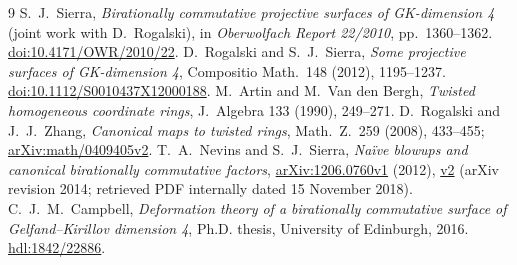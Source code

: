 \documentclass[11pt]{article}
\begin{document}
\begin{thebibliography}{9}
S.~J.~Sierra, \emph{Birationally commutative projective surfaces of
GK-dimension 4} (joint work with D.~Rogalski), in
\emph{Oberwolfach Report 22/2010},
pp.~1360--1362.
\href{https://doi.org/10.4171/OWR/2010/22}{doi:10.4171/OWR/2010/22}.
D.~Rogalski and S.~J.~Sierra,
\emph{Some projective surfaces of GK-dimension 4},
Compositio Math.~148 (2012), 1195--1237.
\href{https://doi.org/10.1112/S0010437X12000188}{doi:10.1112/S0010437X12000188}.
M.~Artin and M.~Van den Bergh,
\emph{Twisted homogeneous coordinate rings},
J.~Algebra 133 (1990), 249--271.
D.~Rogalski and J.~J.~Zhang,
\emph{Canonical maps to twisted rings},
Math.~Z.~259 (2008), 433--455;
\href{https://arxiv.org/abs/math/0409405v2}{arXiv:math/0409405v2}.
T.~A.~Nevins and S.~J.~Sierra,
\emph{Na\"ive blowups and canonical birationally commutative factors},
\href{https://arxiv.org/abs/1206.0760v1}{arXiv:1206.0760v1} (2012),
\href{https://arxiv.org/abs/1206.0760v2}{v2} (arXiv revision 2014;
retrieved PDF internally dated 15 November 2018).
C.~J.~M.~Campbell,
\emph{Deformation theory of a birationally commutative surface of
Gelfand--Kirillov dimension 4}, Ph.D. thesis, University of Edinburgh,
2016. \href{https://hdl.handle.net/1842/22886}{hdl:1842/22886}.
\end{thebibliography}
\end{document}
